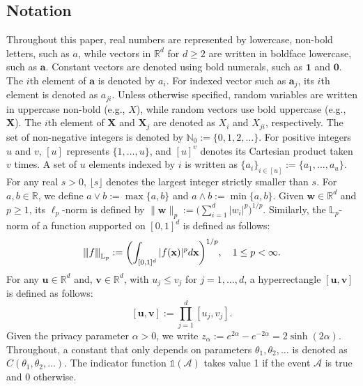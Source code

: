 \documentclass[twoside,11pt]{article}
\newcommand{\indicator}[1]{\mathds{1}\left( #1 \right) }%
\newcommand{\vertiii}[1]{
	{\left\vert\kern-0.25ex\left\vert\kern-0.25ex\left\vert #1 
		\right\vert\kern-0.25ex\right\vert\kern-0.25ex\right\vert}
}%
\newcommand{\vectorize}[1]{\mathbf{#1}}
\newcommand{\dimDensity}{d} %
\newcommand{\domainTs}{
	[0,1]^{{\dimDensity}}
}
\begin{document}
\subsection{Notation}\label{subsection:notation}
Throughout this paper, real numbers are represented by lowercase, non-bold letters, such as \(a\), while vectors in \( \mathbb{R}^d \) for \(d \geq 2\) are written in boldface lowercase, such as \( \mathbf{a} \). Constant vectors are denoted using bold numerals, such as \( \mathbf{1} \) and \( \mathbf{0} \). The $i$th element of \( \mathbf{a} \) is denoted by \( a_i \). For indexed vector such as $\vectorize{a}_j$, its $i$th element is denoted as \( a_{ji} \). Unless otherwise specified, random variables are written in uppercase non-bold (e.g., \( X \)), while random vectors use bold uppercase (e.g., \( \mathbf{X} \)). The $i$th element of $\vectorize{X}$ and $\vectorize{X}_j$ are denoted as $X_i$ and $X_{ji}$, respectively.
The set of non-negative integers is denoted by \( \mathbb{N}_0 := \{0,1,2,\ldots\} \). For positive integers \( u \) and \( v \), \( [u] \) represents \( \{1, \ldots, u\} \), and \( [u]^v \) denotes its Cartesian product taken \( v \) times. A set of \( u \) elements indexed by \( i \) is written as \( \{a_i\}_{i \in [u]} := \{a_1, \ldots, a_u\} \).
For any real \( s > 0 \), \( \lfloor s \rfloor \) denotes the largest integer strictly smaller than \( s \). For \( a, b \in \mathbb{R} \), we define \( a \vee b := \max\{a, b\} \) and \( a \wedge b := \min \{a, b\} \). Given \( \mathbf{w} \in \mathbb{R}^d \) and \( p \geq 1 \), its \( \ell_p \)-norm is defined by \( \|\mathbf{w}\|_p := \bigl(\sum_{i=1}^d |w_i|^p\bigr)^{1/p} \). Similarly, the \( \mathbb{L}_p \)-norm of a function supported on \( [0,1]^d \) is defined as follows:
$$
\vertiii{f}_{\mathbb{L}_p}
:=
\biggl(
\int_{\domainTs}
|f(\vectorize{x})|^p d\vectorize{x}
\biggr)^{1/p},
\quad
1 \leq p < \infty.
$$
For any  $\vectorize{u} \in \mathbb{R}^d$ and, $\vectorize{v} \in \mathbb{R}^\dimDensity$,
with $u_j \leq v_j$ for  $j=1, \ldots, d$, a hyperrectangle $[\vectorize{u},\vectorize{v}]$ is defined as follows:
$$
[\vectorize{u},\vectorize{v}] := \prod_{j=1}^\dimDensity [u_j, v_j].
$$
Given the privacy parameter $\alpha > 0$, we write $z_\alpha := e^{2\alpha}- e^{-2\alpha} = 2 \sinh(2\alpha)$. Throughout, a constant that only depends on parameters $\theta_1,\theta_2,\ldots$ is denoted as $C(\theta_1,\theta_2,\ldots)$. The indicator function $\indicator{\mathcal{A}} $ takes value 1 if the event $\mathcal{A}$ is true and 0 otherwise.
\end{document}
